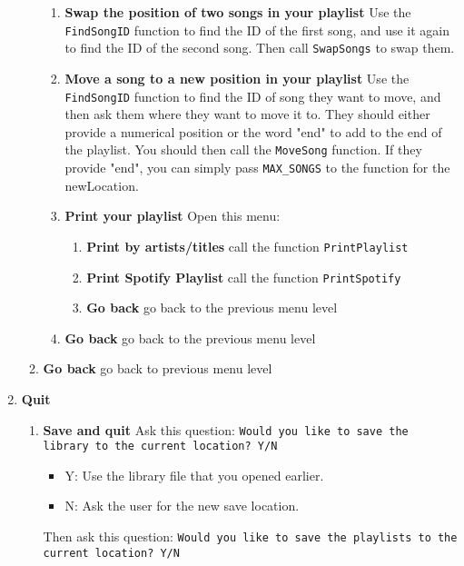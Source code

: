 \begin{enumerate}
\begin{enumerate}
\begin{enumerate}
                    \item \textbf{Swap the position of two songs in your playlist} Use the \texttt{FindSongID} function to find the ID of the first song, and use it again to find the ID of the second song. Then call \texttt{SwapSongs} to swap them. 
                    \item \textbf{Move a song to a new position in your playlist} Use the \texttt{FindSongID} function to find the ID of song they want to move, and then ask them where they want to move it to. They should either provide a numerical position or the word "end" to add to the end of the playlist. You should then call the \texttt{MoveSong} function. If they provide "end", you can simply pass \texttt{MAX_SONGS} to the function for the newLocation.
                    \item \textbf{Print your playlist} Open this menu:
                        \begin{enumerate}
                            \item \textbf{Print by artists/titles} call the function \texttt{PrintPlaylist}
                            \item \textbf{Print Spotify Playlist} call the function \texttt{PrintSpotify}
                            \item \textbf{Go back} go back to the previous menu level
                        \end{enumerate} 
                    \item \textbf{Go back} go back to the previous menu level
                \end{enumerate}
            \item \textbf{Go back} go back to previous menu level
        \end{enumerate}
    \item \textbf{Quit}
        \begin{enumerate}
            \item \textbf{Save and quit} Ask this question: \texttt{Would you like to save the library to the current location? Y/N}
                \begin{itemize}
                    \item Y: Use the library file that you opened earlier.
                    \item N: Ask the user for the new save location.
                \end{itemize}Then ask this question: \texttt{Would you like to save the playlists to the current location? Y/N}

\end{enumerate}
\end{enumerate}
